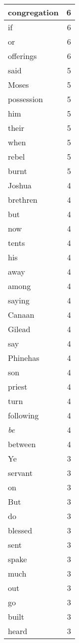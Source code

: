 \begin{center}
\begin{longtable}{l|r}
congregation & 6\\ \hline 
if & 6\\ \hline 
or & 6\\ \hline 
offerings & 6\\ \hline 
said & 5\\ \hline 
Moses & 5\\ \hline 
possession & 5\\ \hline 
him & 5\\ \hline 
their & 5\\ \hline 
when & 5\\ \hline 
rebel & 5\\ \hline 
burnt & 5\\ \hline 
Joshua & 4\\ \hline 
brethren & 4\\ \hline 
but & 4\\ \hline 
now & 4\\ \hline 
tents & 4\\ \hline 
his & 4\\ \hline 
away & 4\\ \hline 
among & 4\\ \hline 
saying & 4\\ \hline 
Canaan & 4\\ \hline 
Gilead & 4\\ \hline 
say & 4\\ \hline 
Phinehas & 4\\ \hline 
son & 4\\ \hline 
priest & 4\\ \hline 
turn & 4\\ \hline 
following & 4\\ \hline 
\emph{be} & 4\\ \hline 
between & 4\\ \hline 
Ye & 3\\ \hline 
servant & 3\\ \hline 
on & 3\\ \hline 
But & 3\\ \hline 
do & 3\\ \hline 
blessed & 3\\ \hline 
sent & 3\\ \hline 
spake & 3\\ \hline 
much & 3\\ \hline 
out & 3\\ \hline 
go & 3\\ \hline 
built & 3\\ \hline 
heard & 3\\ \hline 

\end{longtable}
\end{center}
